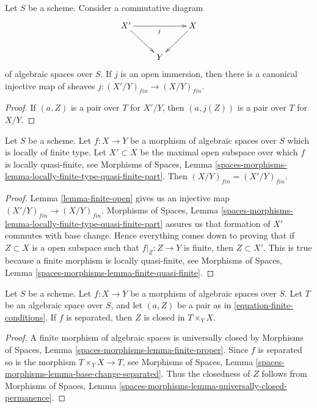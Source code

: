 \begin{lemma}
\label{lemma-finite-open}
Let $S$ be a scheme. Consider a commutative diagram
$$
\xymatrix{
X' \ar[rr]_j \ar[rd] & & X \ar[ld] \\
& Y
}
$$
of algebraic spaces over $S$. If $j$ is an open immersion, then
there is a canonical injective map of sheaves
$j : (X'/Y)_{fin} \to (X/Y)_{fin}$.
\end{lemma}

\begin{proof}
If $(a, Z)$ is a pair over $T$ for $X'/Y$, then
$(a, j(Z))$ is a pair over $T$ for $X/Y$.
\end{proof}

\begin{lemma}
\label{lemma-finite-lives-on-locally-quasi-finite-part}
Let $S$ be a scheme.
Let $f : X \to Y$ be a morphism of algebraic spaces over $S$ which is
locally of finite type.
Let $X' \subset X$ be the maximal open subspace over which $f$ is
locally quasi-finite, see
Morphisms of Spaces,
Lemma \ref{spaces-morphisms-lemma-locally-finite-type-quasi-finite-part}.
Then $(X/Y)_{fin} = (X'/Y)_{fin}$.
\end{lemma}

\begin{proof}
Lemma \ref{lemma-finite-open}
gives us an injective map $(X'/Y)_{fin} \to (X/Y)_{fin}$.
Morphisms of Spaces,
Lemma \ref{spaces-morphisms-lemma-locally-finite-type-quasi-finite-part}
assures us that formation of $X'$ commutes with base change.
Hence everything comes down to proving that if
$Z \subset X$ is a open subspace such that $f|_Z : Z \to Y$ is finite,
then $Z \subset X'$. This is true because a finite morphism
is locally quasi-finite, see
Morphisms of Spaces, Lemma \ref{spaces-morphisms-lemma-finite-quasi-finite}.
\end{proof}

\begin{lemma}
\label{lemma-finite-separated}
Let $S$ be a scheme.
Let $f : X \to Y$ be a morphism of algebraic spaces over $S$.
Let $T$ be an algebraic space over $S$, and let $(a, Z)$ be
a pair as in \ref{equation-finite-conditions}.
If $f$ is separated, then $Z$ is closed in $T \times_Y X$.
\end{lemma}

\begin{proof}
A finite morphism of algebraic spaces is universally closed by
Morphisms of Spaces, Lemma \ref{spaces-morphisms-lemma-finite-proper}.
Since $f$ is separated so is the morphism $T \times_Y X \to T$, see
Morphisms of Spaces, Lemma \ref{spaces-morphisms-lemma-base-change-separated}.
Thus the closedness of $Z$ follows from
Morphisms of Spaces,
Lemma \ref{spaces-morphisms-lemma-universally-closed-permanence}.
\end{proof}

